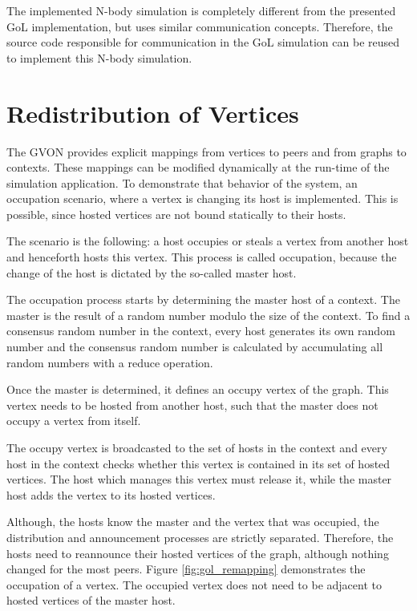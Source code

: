 The implemented N-body simulation is completely different from the
presented GoL implementation, but uses similar communication
concepts. Therefore, the source code responsible for communication in
the GoL simulation can be reused to implement this N-body simulation.


\section{Redistribution of Vertices}

The GVON provides explicit mappings from vertices to peers and from
graphs to contexts. These mappings can be modified dynamically at the
run-time of the simulation application.  To demonstrate that behavior
of the system, an occupation scenario, where a vertex is changing its
host is implemented. This is possible, since hosted vertices are not
bound statically to their hosts.

The scenario is the following: a host occupies or steals a vertex
from another host and henceforth hosts this vertex.  This process
is called occupation, because the change of the host is
dictated by the so-called master host.

The occupation process starts by determining the master host of a
context. The master is the result of a random number modulo the size
of the context. To find a consensus random number in the context,
every host generates its own random number and the consensus random
number is calculated by accumulating all random numbers with a
reduce operation.

Once the master is determined, it defines an occupy vertex of the
graph. This vertex needs to be hosted from another host, such that the
master does not occupy a vertex from itself.

The occupy vertex is broadcasted to the set of hosts in the context
and every host in the context checks whether this vertex is contained
in its set of hosted vertices. The host which manages this vertex must
release it, while the master host adds the vertex to its hosted
vertices.

Although, the hosts know the master and the vertex that was occupied,
the distribution and announcement processes are strictly
separated. Therefore, the hosts need to reannounce their hosted
vertices of the graph, although nothing changed for the most peers.
Figure \ref{fig:gol_remapping} demonstrates the occupation of a
vertex.  The occupied vertex does not need to be adjacent to hosted
vertices of the master host.

